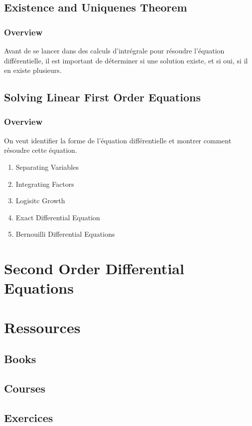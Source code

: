 \documentclass{article}
\begin{document}
\subsection{Existence and Uniquenes Theorem}%
\label{sub:Existence and Uniquenes Theorem}

\subsubsection{Overview}%
\label{sub:Overview}

Avant de se lancer dans des calculs d'intrégrale pour résoudre l'équation
différentielle, il est important de déterminer si une solution existe,
et si oui, si il en existe plusieurs.

\subsection{Solving Linear First Order Equations}%
\label{sub:Solving Linear First Order Equations}

\subsubsection{Overview}%
\label{ssub:Overview}

On veut identifier la forme de l'équation différentielle et montrer
comment résoudre cette équation.

\begin{enumerate}
    \item Separating Variables
    \item Integrating Factors
    \item Logisitc Growth
    \item Exact Differential Equation
    \item Bernouilli Differential Equations
\end{enumerate}


\section{Second Order Differential Equations}

\section{Ressources}%
\label{sec:Ressources}

\subsection{Books}%
\label{sub:Books}

\subsection{Courses}%
\label{sub:Courses}

\subsection{Exercices}%
\label{sub:Exercices}
\end{document}
